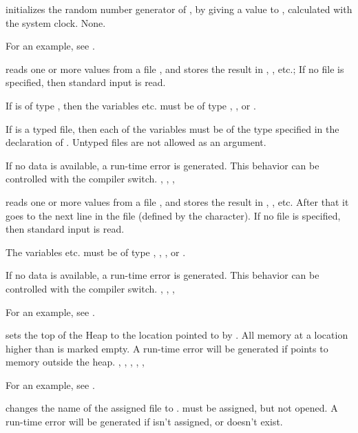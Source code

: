 \documentclass{report}
\begin{document}


{ initializes the random number generator of \fpc, by giving
a value to , calculated with the system clock.
}
{None.}
{}

For an example, see .

{ reads one or more values from a file , and stores the
result in , , etc.; If no file  is specified, then
standard input is read.

If  is of type , then the variables  etc. must be
of type , ,  or .

If  is a typed file, then each of the variables must be of the type
specified in the declaration of . Untyped files are not allowed as an
argument.}
{If no data is available, a run-time error is generated. This behavior can
be controlled with the  compiler switch.}
{, , , }




{ reads one or more values from a file , and stores the
result in , , etc. After that it goes to the next line in
the file (defined by the  character). 
If no file  is specified, then standard input is read.

The variables  etc. must be of type , , 
,  or .
}
{If no data is available, a run-time error is generated. This behavior can
be controlled with the  compiler switch.}
{, , , }

For an example, see .

{ sets the top of the Heap to the location pointed to by
. All memory at a location higher than  is marked empty.}
{A run-time error will be generated if  points to memory outside the
heap.}
{, , , , 
, }

For an example, see .

{ changes the name of the assigned file  to .
must be assigned, but not opened.}
{A run-time error will be generated if  isn't assigned, 
or doesn't exist.}
{}
\end{document}
